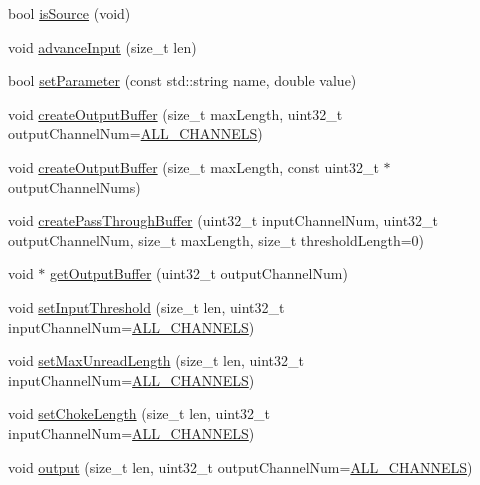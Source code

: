 \begin{DoxyCompactItemize}
\item 
bool \hyperlink{classCRTSFilter_acacdf624ab19ae5ad6394a647dccc353}{is\+Source} (void)
\item 
void \hyperlink{classCRTSFilter_a7898d77d1a5acbadb45769eff2a01cfb}{advance\+Input} (size\+\_\+t len)
\item 
bool \hyperlink{classCRTSFilter_a33ee2e0151f822aec425d6d22ab94757}{set\+Parameter} (const std\+::string name, double value)
\item 
void \hyperlink{classCRTSFilter_a7a10a3daf1d7ee26e8b414c16901b315}{create\+Output\+Buffer} (size\+\_\+t max\+Length, uint32\+\_\+t output\+Channel\+Num=\hyperlink{classCRTSFilter_a9ea354654e8e2e8ce3bff293cc35fafe}{A\+L\+L\+\_\+\+C\+H\+A\+N\+N\+E\+LS})
\item 
void \hyperlink{classCRTSFilter_acc8f53beaf044b384b94e1166a2c53ca}{create\+Output\+Buffer} (size\+\_\+t max\+Length, const uint32\+\_\+t $\ast$output\+Channel\+Nums)
\item 
void \hyperlink{classCRTSFilter_a462892f9ed127c6280f2e62f97aca5bc}{create\+Pass\+Through\+Buffer} (uint32\+\_\+t input\+Channel\+Num, uint32\+\_\+t output\+Channel\+Num, size\+\_\+t max\+Length, size\+\_\+t threshold\+Length=0)
\item 
void $\ast$ \hyperlink{classCRTSFilter_a16b908a9f9ec81ff3b52a98f447b3bb4}{get\+Output\+Buffer} (uint32\+\_\+t output\+Channel\+Num)
\item 
void \hyperlink{classCRTSFilter_a4d221e7b871d483f68c73c379fd08cd3}{set\+Input\+Threshold} (size\+\_\+t len, uint32\+\_\+t input\+Channel\+Num=\hyperlink{classCRTSFilter_a9ea354654e8e2e8ce3bff293cc35fafe}{A\+L\+L\+\_\+\+C\+H\+A\+N\+N\+E\+LS})
\item 
void \hyperlink{classCRTSFilter_aa484e49c5a75c467209324930bc1a0bf}{set\+Max\+Unread\+Length} (size\+\_\+t len, uint32\+\_\+t input\+Channel\+Num=\hyperlink{classCRTSFilter_a9ea354654e8e2e8ce3bff293cc35fafe}{A\+L\+L\+\_\+\+C\+H\+A\+N\+N\+E\+LS})
\item 
void \hyperlink{classCRTSFilter_acadfaf372947b1b7cbcb5667e6b74026}{set\+Choke\+Length} (size\+\_\+t len, uint32\+\_\+t input\+Channel\+Num=\hyperlink{classCRTSFilter_a9ea354654e8e2e8ce3bff293cc35fafe}{A\+L\+L\+\_\+\+C\+H\+A\+N\+N\+E\+LS})
\item 
void \hyperlink{classCRTSFilter_afe899250f3aa73aa8eb5aed7dfc371de}{output} (size\+\_\+t len, uint32\+\_\+t output\+Channel\+Num=\hyperlink{classCRTSFilter_a9ea354654e8e2e8ce3bff293cc35fafe}{A\+L\+L\+\_\+\+C\+H\+A\+N\+N\+E\+LS})

\end{DoxyCompactItemize}
